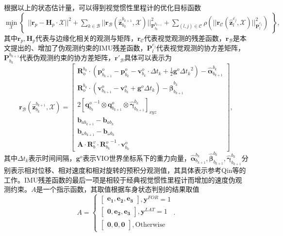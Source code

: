 根据以上的状态估计量，可以得到视觉惯性里程计的优化目标函数
\begin{equation}
  \min_{\mathcal{X}} \begin{Bmatrix} || \symbf{r}_p - \symbf{H}_p \cdot \mathcal{X} ||^2 + \sum_{k\in\mathcal{B}} || \symbf{r}_{\mathcal{B}}(\hat{\symbf{z}}_{b_k}^{b_{k+1}}, \mathcal{X}) ||^2_{\symbf{P}_{b_k}^{b_{k+1}}} + \sum_{(l,j)\in\mathcal{C}} \rho(|| \symbf{r}_{\mathcal{C}}(\hat{\symbf{z}}_{l}^{c_j}, \mathcal{X}) ||^2_{\symbf{P}_{l}^{c_j}}) \end{Bmatrix},
\end{equation}
其中$\symbf{r}_p, \symbf{H}_p$代表与边缘化相关的观测与矩阵，$\symbf{r}_{\mathcal{C}}$代表视觉观测的残差函数，$\symbf{r}_{\mathcal{B}}$是本文提出的、增加了伪观测约束的IMU残差函数，$\symbf{P}_{l}^{c_j}$代表视觉观测的协方差矩阵，$\symbf{P}_{b_k}^{b_{k+1}}$代表伪观测约束的协方差矩阵，$\symbf{r}'_{\mathcal{B}}$具体可以表示为
\begin{equation}
  \symbf{r}_{\mathcal{B}}(\hat{\symbf{z}}_{b_k}^{b_{k+1}}, \mathcal{X}) = 
  \begin{bmatrix} 
    \symbf{R}_o^{b_k} \cdot (\symbf{p}_{b_{k+1}}^o -\symbf{p}_{b_k}^o-\symbf{v}_{b_k}^o\cdot\Delta t_k + \frac{1}{2}\symbf{g}^o{\Delta t_k}^2) - \hat{\symbf{\alpha}}_{b_{k+1}}^{b_k} \\
    \symbf{R}_o^{b_k} \cdot (\symbf{v}_{b_{k+1}}^o - \symbf{v}_{b_k}^o + \symbf{g}^o\Delta t_k) - \hat{\symbf{\beta}}_{b_{k+1}}^{b_k} \\
    2[{\symbf{q}^o_{b_k}}^{-1}\otimes\symbf{q}_{b_{k+1}}^o \otimes \hat{\symbf{\gamma}}_{b_{k+1}}^{b_k}]_{xyz} \\
    \symbf{b}_{ab_{k+1}} - \symbf{b}_{ab_{k}} \\
    \symbf{b}_{\omega b_{k+1}} - \symbf{b}_{\omega b_{k}} \\
    \symbf{A} \cdot \symbf{R}_b^v \cdot {\symbf{R}_{b_k}^o}^{-1} \cdot \symbf{v}_{b_k}^o
  \end{bmatrix},
  \label{eq:imu_residual}
\end{equation}
其中$\Delta t_k$表示时间间隔，$\symbf{g}^o$表示VIO世界坐标系下的重力向量，$\hat{\symbf{\alpha}}_{b_{k+1}}^{b_k}, \hat{\symbf{\beta}}_{b_{k+1}}^{b_k}, \hat{\symbf{\gamma}}_{b_{k+1}}^{b_k}$分别表示相对位移、相对速度和相对旋转的预积分观测值，其具体表示参考Qin等\cite{qin2018vins}的工作。IMU残差函数的最后一项是相较于经典视觉惯性里程计而增加的速度伪观测约束。$A$是一个指示函数，其取值根据车身状态判别的结果取值
\begin{equation}
  A = 
  \begin{cases}
    \begin{bmatrix} \symbf{e_1}, \symbf{e_2}, \symbf{e_3}  \end{bmatrix}, \symbf{y}^{FOR} = 1 \\
    \begin{bmatrix} \symbf{0}, \symbf{e_2}, \symbf{e_3}  \end{bmatrix}, \symbf{y}^{LAT} = 1 \\
    \begin{bmatrix} \symbf{0}, \symbf{0}, \symbf{0}  \end{bmatrix}, \text{Otherwise}
  \end{cases}.
\end{equation}
